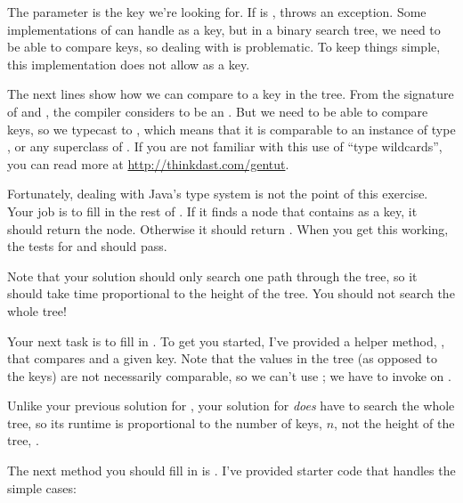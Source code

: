 \documentclass[12pt]{book}
\theoremstyle{exercise}
\begin{document}

The parameter  is the key we're looking for. If
 is ,  throws an exception.
Some implementations of  can handle  as a key,
but in a binary search tree, we need to be able to compare keys, so
dealing with  is problematic. To keep things simple,
this implementation does not allow  as a key.

The next lines show how we can compare  to a key in the
tree. From the signature of  and , the
compiler considers  to be an . But we need
to be able to compare keys, so we typecast  to
, which means that
it is comparable to an instance of type , or any superclass of
.  If you are not familiar with this use of ``type
wildcards'', you can read more at
\url{http://thinkdast.com/gentut}.


Fortunately, dealing with Java's type system is not the point of this
exercise. Your job is to fill in the rest of . If it
finds a node that contains  as a key, it should return
the node. Otherwise it should return . When you get this
working, the tests for  and  should
pass.

Note that your solution should only search one path through the tree, so
it should take time proportional to the height of the tree. You should
not search the whole tree!


Your next task is to fill in . To get you started,
I've provided a helper method, , that compares
 and a given key. Note that the values in the tree (as
opposed to the keys) are not necessarily comparable, so we can't use
; we have to invoke  on .


Unlike your previous solution for , your solution for
 \emph{does} have to search the whole tree, so its
runtime is proportional to the number of keys, $n$, not the
height of the tree, .

The next method you should fill in is . I've provided
  starter code that handles the simple cases:
\end{document}
